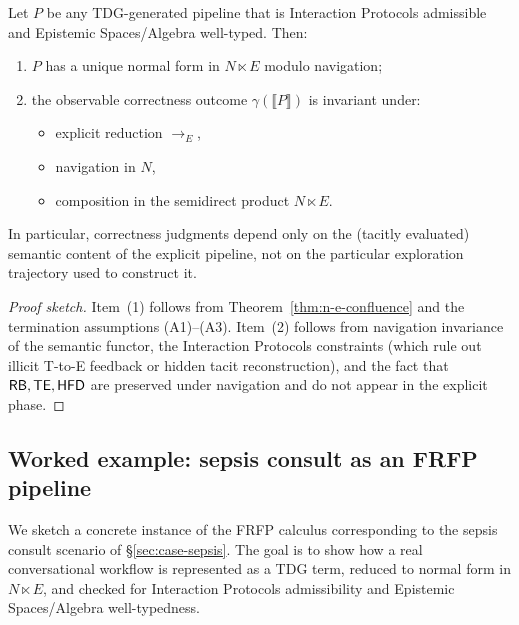 \begin{theorem}
\label{thm:semantic-correctness}
Let \(P\) be any TDG-generated pipeline that is Interaction Protocols admissible and
Epistemic Spaces/Algebra well-typed. Then:
\begin{enumerate}
  \item \(P\) has a unique normal form in \(N \ltimes E\) modulo navigation;
  \item the observable correctness outcome \(\gamma(\llbracket P \rrbracket)\)
        is invariant under:
        \begin{itemize}
          \item explicit reduction \(\to_E\),
          \item navigation in \(N\),
          \item composition in the semidirect product \(N \ltimes E\).
        \end{itemize}
\end{enumerate}
In particular, correctness judgments depend only on the (tacitly evaluated)
semantic content of the explicit pipeline, not on the particular exploration
trajectory used to construct it.
\end{theorem}

\begin{proof}[Proof sketch]
Item~(1) follows from Theorem~\ref{thm:n-e-confluence} and the termination
assumptions (A1)--(A3). Item~(2) follows from navigation invariance of the
semantic functor, the Interaction Protocols constraints (which rule out illicit T-to-E
feedback or hidden tacit reconstruction), and the fact that \(\mathsf{RB},\mathsf{TE},\mathsf{HFD}\)
are preserved under navigation and do not appear in the explicit phase.
\end{proof}

\subsection{Worked example: sepsis consult as an FRFP pipeline}
\label{sec:cp-sepsis-example}
We sketch a concrete instance of the FRFP calculus corresponding to the sepsis consult scenario
of \S\ref{sec:case-sepsis}. The goal is to show how a real conversational workflow is
represented as a TDG term, reduced to normal form in $N \ltimes E$, and checked for
Interaction Protocols admissibility and Epistemic Spaces/Algebra well-typedness.

